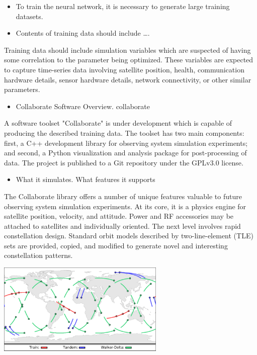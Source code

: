 \documentclass[11pt]{article}
\begin{document}
\begin{itemize}
\item To train the neural network, it is necessary to generate large training
datasets.

\item Contents of training data should include \ldots{}.
\end{itemize}

Training data should include simulation variables which are suspected of having
some correlation to the parameter being optimized.  These variables are expected
to capture time-series data involving satellite position, health, communication
hardware details, sensor hardware details, network connectivity, or other
similar parameters.

\begin{itemize}
\item Collaborate Software Overview.  collaborate
\end{itemize}
A software toolset "Collaborate" is under development which is capable of
producing the described training data.  The toolset has two main components:
first, a C++ development library for observing system simulation experiments;
and second, a Python visualization and analysis package for post-processing of
data.  The project is published to a Git repository under the GPLv3.0 license.

\begin{itemize}
\item What it simulates. What features it supports
\end{itemize}
The Collaborate library offers a number of unique features valuable to future
observing system simulation experiments.  At its core, it is a physics engine
for satellite position, velocity, and attitude.  Power and RF accessories may be
attached to satellites and individually oriented.  The next level involves rapid
constellation design.  Standard orbit models described by two-line-element (TLE)
sets are provided, copied, and modified to generate novel and interesting
constellation patterns.

\begin{center}
\includegraphics[width=0.6\textwidth]{./images/constellations.pdf}
\end{center}
\end{document}
